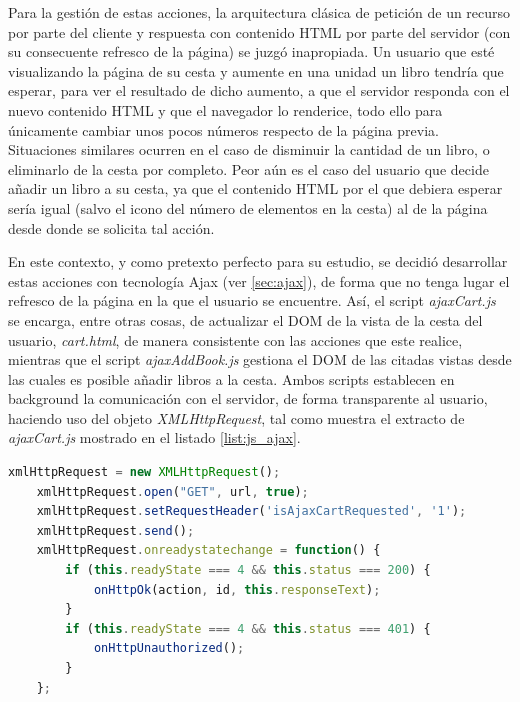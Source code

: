 \documentclass[a4paper]{article}
\begin{document}
    Para la gestión de estas acciones, la arquitectura clásica de petición de un recurso por parte del cliente y respuesta con contenido HTML por parte del servidor (con su consecuente refresco de la página) se juzgó inapropiada. Un usuario que esté visualizando la página de su cesta y aumente en una unidad un libro tendría que esperar, para ver el resultado de dicho aumento, a que el servidor responda con el nuevo contenido HTML y que el navegador lo renderice, todo ello para únicamente cambiar unos pocos números respecto de la página previa. Situaciones similares ocurren en el caso de disminuir la cantidad de un libro, o eliminarlo de la cesta por completo. Peor aún es el caso del usuario que decide añadir un libro a su cesta, ya que el contenido HTML por el que debiera esperar sería igual (salvo el icono del número de elementos en la cesta) al de la página desde donde se solicita tal acción.
    
    En este contexto, y como pretexto perfecto para su estudio, se decidió desarrollar estas acciones con tecnología Ajax (ver \ref{sec:ajax}), de forma que no tenga lugar el refresco de la página en la que el usuario se encuentre. Así, el script \emph{ajaxCart.js} se encarga, entre otras cosas, de actualizar el DOM de la vista de la cesta del usuario, \emph{cart.html}, de manera consistente con las acciones que este realice, mientras que el script \emph{ajaxAddBook.js} gestiona el DOM de las citadas vistas desde las cuales es posible añadir libros a la cesta. Ambos scripts establecen en background la comunicación con el servidor, de forma transparente al usuario, haciendo uso del objeto \emph{XMLHttpRequest}, tal como muestra el extracto de \emph{ajaxCart.js} mostrado en el listado \ref{list:js_ajax}.
    \\
    
    \begin{lstlisting}[language=JavaScript,caption=Comunicación Ajax con el servidor,label=list:js_ajax]
    xmlHttpRequest = new XMLHttpRequest();
    xmlHttpRequest.open("GET", url, true);
    xmlHttpRequest.setRequestHeader('isAjaxCartRequested', '1');
    xmlHttpRequest.send();
    xmlHttpRequest.onreadystatechange = function() {
    	if (this.readyState === 4 && this.status === 200) {
    		onHttpOk(action, id, this.responseText);
    	}
    	if (this.readyState === 4 && this.status === 401) {
    		onHttpUnauthorized();
    	}
    };
    \end{lstlisting}
    
\end{document}
